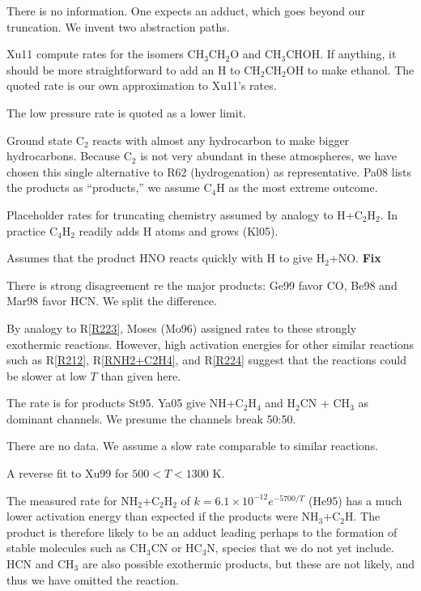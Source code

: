 \documentclass[12pt,landscape]{article}
\newcounter{reaction}
\begin{document}
 There is no information.  One expects an adduct, which goes beyond our truncation.  We invent two abstraction paths.


  Xu11 compute rates for the isomers CH$_3$CH$_2$O and CH$_3$CHOH.  If anything, it should be more straightforward to add
 an H to CH$_2$CH$_2$OH to make ethanol.  The quoted rate is our own approximation to Xu11's rates.

   The low pressure rate is quoted as a lower limit.

  Ground state C$_2$ reacts with almost any hydrocarbon to make bigger hydrocarbons.  Because C$_2$ is not very abundant in these atmospheres, we have chosen this single alternative to R62 (hydrogenation) as representative. Pa08 lists the products as ``products,'' we assume C$_4$H as the most extreme outcome.

  Placeholder rates for truncating chemistry assumed by analogy to H+C$_2$H$_2$. 
In practice C$_4$H$_2$ readily adds H atoms and grows (Kl05).

 Assumes that the product HNO reacts quickly with H to give H$_2$+NO. {\bf Fix}

  There is strong disagreement re the major products: Ge99 favor CO, Be98 and Mar98 favor HCN.  We split the difference.

   By analogy to R\ref{R223}, Moses (Mo96) assigned rates to these strongly exothermic reactions. However, high activation energies for other similar reactions such as R\ref{R212}, R\ref{RNH2+C2H4}, and R\ref{R224} suggest that the reactions could be slower at low $T$ than given here.
 
   The rate is for products St95. Ya05 give NH+C$_2$H$_4$ and H$_2$CN + CH$_3$ as dominant channels.  We presume the channels break 50:50.

  There are no data.  We assume a slow rate comparable to similar reactions.  

  A reverse fit to Xu99 for $500<T<1300$ K.  

  The measured rate for NH$_2$+C$_2$H$_2$ of $k=6.1\!\times\! 10^{-12}e^{-5700/T}$ (He95) has a much lower activation energy than expected if the products were NH$_3$+C$_2$H.  The product is therefore likely to be an adduct
 leading perhaps to the formation of stable molecules such as CH$_3$CN or HC$_3$N, species that we do not yet include.
 HCN and CH$_3$ are also possible exothermic products, but these are not likely, and thus we have omitted the reaction.
 
\end{document}
